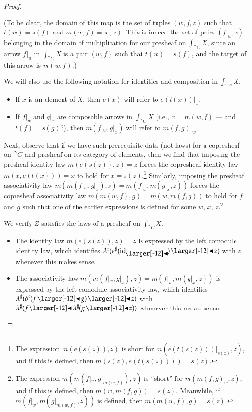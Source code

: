 \documentclass{amsart}
\begin{document}
\begin{proof}
\begin{itemize}
    (To be clear, the domain of this map is the set of tuples
    $(w, f, z)$ such that $t(w) = s(f)$ and $m(w, f) = s(z)$. This is
    indeed the set of pairs $(f|_w, z)$ belonging in the domain of
    multiplication for our presheaf on $\int_{\cat{C}}X$, since an arrow
    $f|_w$ in $\int_{\cat{C}}X$ is a pair $(w, f)$ such that
    $t(w) = s(f)$, and the target of this arrow is $m(w, f)$.)
  \end{itemize}

  We will also use the following notation for identities and
  composition in $\int_{\cat{C}}X$.
  \begin{itemize}
  \item If $x$ is an element of $X$, then $e(x)$ will refer to
    $e(t(x))|_x$.
  \item If $f|_w$ and $g|_x$ are composable arrows in $\int_{\cat{C}}X$
    (i.e., $x = m(w,f)$ --- and $t(f) = s(g)$?), then $m(f|_w, g|_x)$ will refer to
    $m(f, g)|_w$.
  \end{itemize}

  Next, observe that if we have such prerequisite data (not laws) for
  a copresheaf on $\cat{C}$ and presheaf on its category of elements,
  then we find that imposing the presheaf identity law
  $m(e(s(z)), z) = z$ forces the copresheaf identity law
  $m(x, e(t(x))) = x$ to hold for $x = s(z)$.\footnote{The expression
    $m(e(s(z)), z)$ is short for $m(e(t(s(z)))|_{s(z)},z)$, and if
    this is defined, then $m(s(z), e(t(s(z)))) = s(z)$.} Similarly,
  imposing the presheaf associativity law
  $m(m(f|_w, g|_x), z) = m(f|_w, m(g|_x, z))$ forces the copresheaf
  associativity law $m(m(w, f), g) = m(w, m(f, g))$ to hold for
  $f$ and $g$ such that one of the earlier expressions is defined for some
  $w$, $x$, $z$.\footnote{The expression
    $m(m(f|_w, g|_{m(w, f)}), z)$ is ``short'' for $m(m(f, g)_w, z)$,
    and if this is defined, then $m(w, m(f, g)) = s(z)$. Meanwhile, if
    $m(f|_w, m(g|_{m(w, f)}, z))$ is defined, then
    $m(m(w, f), g) = s(z)$.}
  
  We verify $Z$ satisfies the laws of a presheaf on $\int_{\cat{C}}X$.
  \begin{itemize}
  \item The identity law $m(e(s(z)), z) = z$ is
    expressed by the left comodule identity law, which identifies
    ${\anydirmap{\lambda}{\anydirmap{\varepsilon}{\idsubd} \subd z}}$ with
    $z$ whenever this makes sense.
  \item The associativity law
    $m(m(f|_w, g|_x), z) = m(f|_w, m(g|_x, z))$ is
    expressed by the left comodule associativity law, which identifies
    ${\anydirmap{\lambda}{\anydirmap{\delta}{f \subd g} \subd z}}$
    with
    ${\anydirmap{\lambda}{f \subd \anydirmap{\lambda}{g \subd z}}}$
    whenever this makes sense.
  \end{itemize}


\end{proof}
\end{document}
